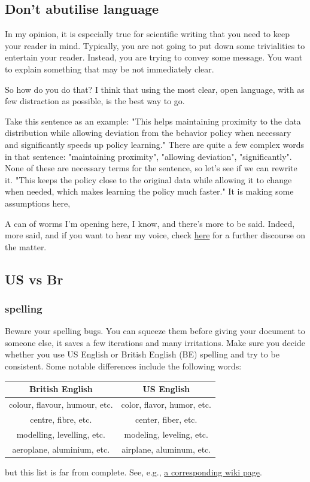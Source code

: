 \documentclass{article}
\begin{document}
\subsection{Don't abutilise language}
In my opinion, it is especially true for scientific writing that you need to keep your reader in mind. Typically, you are not going to put down some trivialities to entertain your reader. Instead, you are trying to convey some message. You want to explain something that may be not immediately clear.

So how do you do that?  I think that using the most clear, open language, with as few distraction as possible, is the best way to go.

Take this sentence as an example: "This helps maintaining proximity to the data distribution while allowing deviation from the behavior policy when necessary and significantly speeds up policy learning." There are quite a few complex words in that sentence: "maintaining proximity", "allowing deviation", "significantly".  None of these are necessary terms for the sentence, so let's see if we can rewrite it.
"This keeps the policy close to the original data while allowing it to change when needed, which makes learning the policy much faster."  It is making some assumptions here, 

A can of worms I'm opening here, I know, and there's more to be said.  Indeed, more said, and if you want to hear my  voice, check
\href{https://smagt.github.io/readable\%20paper\%20writing.html}{here} for a further discourse on the matter.


\subsection{US vs Br}
\subsubsection{spelling}

Beware your spelling bugs.  You can squeeze them before giving your document to someone else, it saves a few iterations and many irritations.  Make sure you decide whether you use US English or British English (BE) spelling and try to be consistent.
Some notable differences include the following words:
\begin{center}\begin{tabular}{c|c}
British English & US English \\\hline
colour, flavour, humour, etc.	& color, flavor, humor, etc.\\
centre, fibre, etc.	& center, fiber, etc.\\
modelling, levelling, etc.		& modeling, leveling, etc.\\
aeroplane, aluminium, etc.			& airplane, aluminum, etc.
\end{tabular}\end{center}
but this list is far from complete.  See, e.g., \href{http://en.wikipedia.org/wiki/American_and_British_English_spelling_differences}{a corresponding wiki page}.
\end{document}
